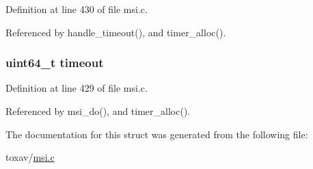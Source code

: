 Definition at line 430 of file msi.\+c.



Referenced by handle\+\_\+timeout(), and timer\+\_\+alloc().

\hypertarget{struct___timer_a053cdea1d85795444fe1aaa6b277a0ec}{
\subsubsection[{timeout}]{\setlength{\rightskip}{0pt plus 5cm}uint64\+\_\+t timeout}}\label{struct___timer_a053cdea1d85795444fe1aaa6b277a0ec}


Definition at line 429 of file msi.\+c.



Referenced by msi\+\_\+do(), and timer\+\_\+alloc().



The documentation for this struct was generated from the following file\+:\begin{DoxyCompactItemize}
\item 
toxav/\hyperlink{msi_8c}{msi.\+c}\end{DoxyCompactItemize}
